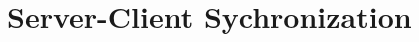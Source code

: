 
\section{Server-Client Sychronization}

\begin{comment}

this section talks about the decision for server client architecture.
server-client allows master copy to exist on server.

- master copy of world on server
- clients perform no logic, only apply updates to 

\end{comment}
